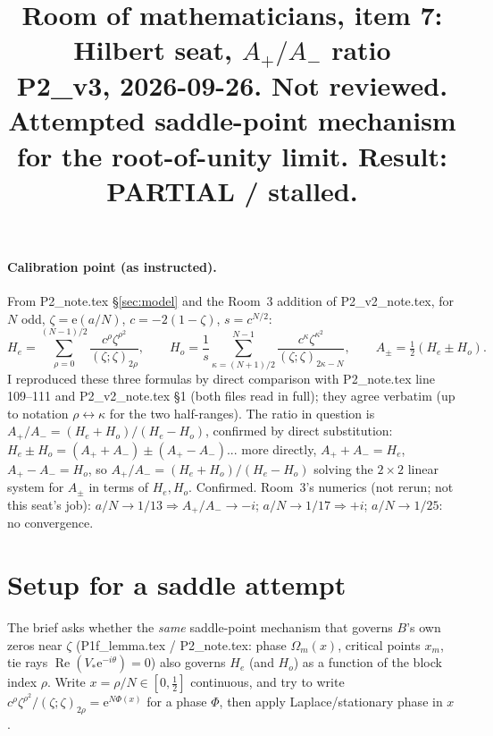 \documentclass[11pt]{article}
\title{Room of mathematicians, item 7: Hilbert seat, $A_+/A_-$ ratio\\
\small P2\_v3, 2026-09-26. Not reviewed. Attempted saddle-point mechanism for the root-of-unity limit. Result: PARTIAL / stalled.}
\date{}
\theoremstyle{remark}\newtheorem{remark}[theorem]{Remark}
\newcommand{\e}{\mathrm{e}}
\begin{document}
\maketitle

\paragraph{Calibration point (as instructed).} From P2\_note.tex \S\ref{sec:model} and the Room~3 addition of
P2\_v2\_note.tex, for $N$ odd, $\zeta=\e(a/N)$, $c=-2(1-\zeta)$, $s=c^{N/2}$:
\[H_e=\sum_{\rho=0}^{(N-1)/2}\frac{c^\rho\zeta^{\rho^2}}{(\zeta;\zeta)_{2\rho}},\qquad
H_o=\frac1s\sum_{\kappa=(N+1)/2}^{N-1}\frac{c^\kappa\zeta^{\kappa^2}}{(\zeta;\zeta)_{2\kappa-N}},\qquad
A_\pm=\tfrac12(H_e\pm H_o).\]
I reproduced these three formulas by direct comparison with P2\_note.tex line 109--111 and P2\_v2\_note.tex \S1 (both files
read in full); they agree verbatim (up to notation $\rho\leftrightarrow\kappa$ for the two half-ranges). The ratio in question is
$A_+/A_-=(H_e+H_o)/(H_e-H_o)$, confirmed by direct substitution: $H_e\pm H_o=(A_++A_-)\pm(A_+-A_-)$... more directly,
$A_++A_-=H_e$, $A_+-A_-=H_o$, so $A_+/A_- = (H_e+H_o)/(H_e-H_o)$ solving the $2\times2$ linear system for $A_\pm$ in terms of
$H_e,H_o$. Confirmed. Room~3's numerics (not rerun; not this seat's job): $a/N\to1/13\Rightarrow A_+/A_-\to-i$; $a/N\to1/17
\Rightarrow+i$; $a/N\to1/25$: no convergence.

\section{Setup for a saddle attempt}
The brief asks whether the \emph{same} saddle-point mechanism that governs $B$'s own zeros near $\zeta$ (P1f\_lemma.tex /
P2\_note.tex: phase $\Omega_m(x)$, critical points $x_m$, tie rays $\operatorname{Re}(V_*\e^{-i\theta})=0$) also governs $H_e$
(and $H_o$) as a function of the block index $\rho$. Write $x=\rho/N\in[0,\frac12]$ continuous, and try to write
$c^\rho\zeta^{\rho^2}/(\zeta;\zeta)_{2\rho}=\e^{N\Phi(x)}$ for a phase $\Phi$, then apply Laplace/stationary phase in $x$.
\end{document}
